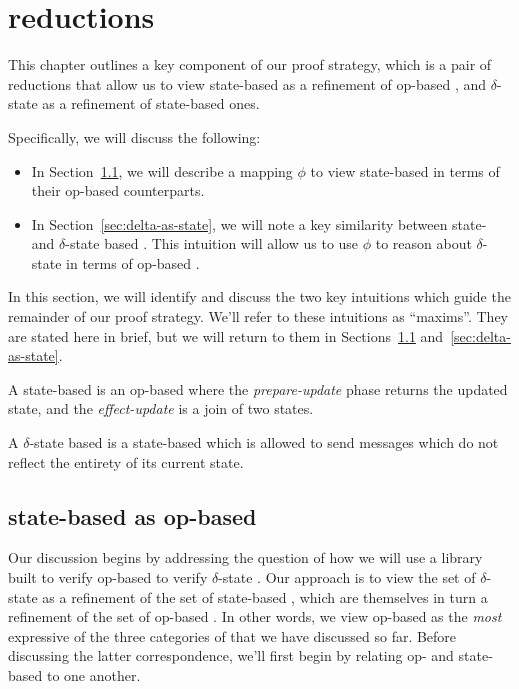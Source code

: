 \chapter{\CRDT reductions}
\label{chap:crdt-reductios}

This chapter outlines a key component of our proof strategy, which is a pair of
reductions that allow us to view state-based \CRDTs as a refinement of op-based
\CRDTs, and $\delta$-state \CRDTs as a refinement of state-based ones.

Specifically, we will discuss the following:
\begin{itemize}
  \item In Section~\ref{sec:state-as-op}, we will describe a mapping $\phi$ to
    view state-based \CRDTs in terms of their op-based counterparts.
  \item In Section~\ref{sec:delta-as-state}, we will note a key similarity
    between state- and $\delta$-state based \CRDTs. This intuition will allow us
    to use $\phi$ to reason about $\delta$-state \CRDTs in terms of op-based
    \CRDTs.
\end{itemize}

In this section, we will identify and discuss the two key intuitions which guide
the remainder of our proof strategy. We'll refer to these intuitions as
``maxims''. They are stated here in brief, but we will return to them in
Sections~\ref{sec:state-as-op} and~\ref{sec:delta-as-state}.

\begin{maxim}
  \label{maxim:state-as-op}
  A state-based \CRDT is an op-based \CRDT where the \emph{prepare-update} phase
  returns the updated state, and the \emph{effect-update} is a join of two
  states.
\end{maxim}

\begin{maxim}
  \label{maxim:delta-as-state}
  A $\delta$-state based \CRDT is a state-based \CRDT which is allowed to send
  messages which do not reflect the entirety of its current state.
\end{maxim}

\section{state-based \CRDTs as op-based}
\label{sec:state-as-op}
Our discussion begins by addressing the question of how we will use a library
built to verify op-based \CRDTs to verify $\delta$-state \CRDTs. Our approach is
to view the set of $\delta$-state \CRDTs as a refinement of the set of
state-based \CRDTs, which are themselves in turn a refinement of the set of
op-based \CRDTs. In other words, we view op-based \CRDTs as the \emph{most}
expressive of the three categories of \CRDTs that we have discussed so far.
Before discussing the latter correspondence, we'll first begin by relating op-
and state-based \CRDTs to one another.

